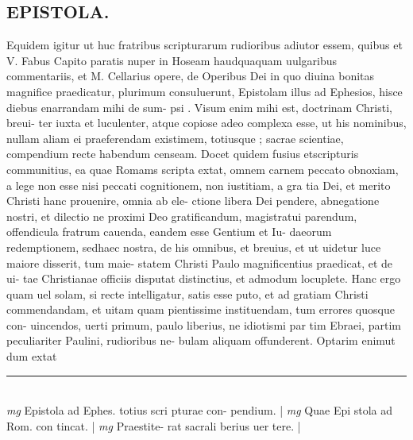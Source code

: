 \documentclass{article}
\begin{document}
\begin{pages}
\section*{EPISTOLA.  }\pstart Equidem igitur ut huc fratribus scripturarum rudioribus   adiutor essem, quibus et V. Fabus  Capito paratis nuper in Hoseam haudquaquam uulgaribus commentariis, et M.  Cellarius opere, de Operibus Dei in quo diuina bonitas magnifice praedicatur, plurimum consuluerunt, Epistolam illus ad Ephesios, hisce diebus enarrandam mihi de sum- psi .  Visum enim mihi est, doctrinam Christi, breui- ter iuxta et luculenter, atque  copiose adeo complexa esse, ut his nominibus, nullam aliam ei praeferendam existimem, totiusque ; sacrae scientiae, compendium recte habendum censeam.   \pend\pstart Docet quidem fusius etscripturis communitius, ea quae Romams scripta extat, omnem carnem peccato obnoxiam, a lege non esse nisi peccati cognitionem, non iustitiam, a gra tia Dei, et merito Christi hanc prouenire, omnia ab ele- ctione libera Dei pendere, abnegatione nostri, et dilectio ne proximi Deo gratificandum, magistratui parendum, offendicula fratrum cauenda, eandem esse Gentium et Iu- daeorum redemptionem, sedhaec nostra, de his omnibus, et breuius, et ut uidetur luce maiore disserit, tum maie- statem Christi Paulo magnificentius praedicat, et de ui- tae Christianae officiis disputat distinctius, et admodum locuplete.   \pend\pstart Hanc ergo quam uel solam, si recte intelligatur, satis esse puto, et ad gratiam Christi commendandam, et uitam quam pientissime instituendam, tum errores quosque  con- uincendos, uerti primum, paulo liberius, ne idiotismi par tim Ebraei, partim peculiariter Paulini, rudioribus ne- bulam aliquam offunderent. Optarim enimut dum extat  \pend
\vspace{0.5cm}\noindent
\vspace{0.2cm}\rule{1cm}{0.2pt}\\ 
\hspace{0.2cm}\textit{mg}
\footnotesize Epistola ad Ephes.  totius scri pturae con- pendium.  
\normalsize| 
\hspace{0.2cm}\textit{mg}
\footnotesize Quae Epi stola ad Rom.  con tincat.  
\normalsize| 
\hspace{0.2cm}\textit{mg}
\footnotesize Praestite- rat sacrali berius uer tere.  
\normalsize| 

\end{pages}
\end{document}
